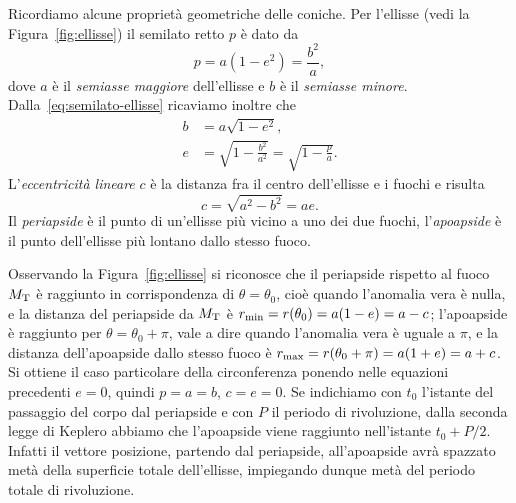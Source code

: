 Ricordiamo alcune proprietà geometriche delle coniche. Per l'ellisse (vedi la
Figura~\ref{fig:ellisse}) il semilato retto $p$ è dato da
\begin{equation}
  \label{eq:semilato-ellisse}
  p = a(1-e^2) = \frac{b^2}{a},
\end{equation}
dove $a$ è il \emph{semiasse maggiore} dell'ellisse e $b$ è il \emph{semiasse
  minore}. Dalla~\eqref{eq:semilato-ellisse} ricaviamo inoltre che
\begin{align}
  b &= a\sqrt{1-e^2}, \label{eq:semiasse-minore-ellisse}\\
  e &= \sqrt{1-\frac{b^2}{a^2}} =
  \sqrt{1-\frac{p}{a}}. \label{eq:eccentricita-ellisse}
\end{align}
L'\emph{eccentricità lineare} $c$ è la distanza fra il centro dell'ellisse e i
fuochi e risulta
\begin{equation}
  c=\sqrt{a^2-b^2} = ae.
\end{equation}
Il \emph{periapside} è il punto di un'ellisse più vicino a uno dei due fuochi,
l'\emph{apoapside} è il punto dell'ellisse più lontano dallo stesso fuoco.

Osservando la Figura~\ref{fig:ellisse} si riconosce che il periapside rispetto
al fuoco $M_\textup{T}$ è raggiunto in corrispondenza di $\theta=\theta_0$, cioè
quando l'anomalia vera è nulla, e la distanza del periapside da $M_\textup{T}$ è
$r_\textup{min} = r(\theta_0) = a(1-e) = a-c$; l'apoapside è raggiunto per
$\theta=\theta_0+\pi$, vale a dire quando l'anomalia vera è uguale a $\pi$, e la
distanza dell'apoapside dallo stesso fuoco è $r_\textup{max} = r(\theta_0+\pi) =
a(1+e)= a+c$. Si ottiene il caso particolare della circonferenza ponendo nelle
equazioni precedenti $e=0$, quindi $p=a=b$, $c=e=0$. Se indichiamo con $t_0$
l'istante del passaggio del corpo dal periapside e con $P$ il periodo di
rivoluzione, dalla seconda legge di Keplero abbiamo che l'apoapside viene
raggiunto nell'istante $t_0 + P/2$. Infatti il vettore posizione, partendo dal
periapside, all'apoapside avrà spazzato metà della superficie totale
dell'ellisse, impiegando dunque metà del periodo totale di rivoluzione.

